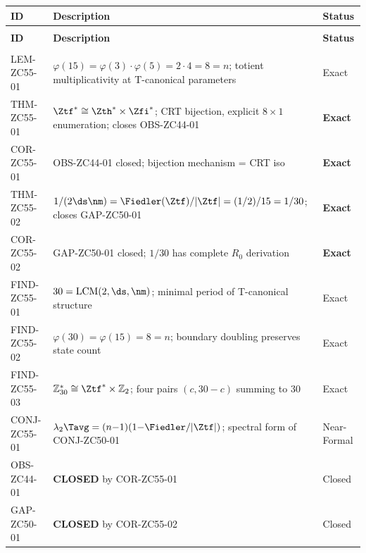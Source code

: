 \documentclass[12pt, a4paper]{article}
\begin{document}
\bigskip
{}
\begin{formalbox}[title={Atomic Registry --- ZC55}]
{\small
\setlength{\LTpre}{4pt}
\setlength{\LTpost}{4pt}
\renewcommand{\arraystretch}{1.30}
\begin{longtable}{>{\raggedright\arraybackslash}p{3.2cm}
                  >{\raggedright\arraybackslash}p{7.0cm}
                  >{\centering\arraybackslash}p{2.0cm}}
\toprule
\textbf{ID} & \textbf{Description} & \textbf{Status} \\
\midrule
\endfirsthead
\multicolumn{3}{l}{\small\textit{(continued)}}\\[4pt]
\toprule
\textbf{ID} & \textbf{Description} & \textbf{Status} \\
\midrule
\endhead
\midrule
\multicolumn{3}{r}{\small\textit{(continues)}}\\
\endfoot
\bottomrule
\endlastfoot
LEM-ZC55-01 &
  $\varphi(15)=\varphi(3)\cdot\varphi(5)=2\cdot4=8=n$;
  totient multiplicativity at T-canonical parameters &
  Exact \\[4pt]
THM-ZC55-01 &
  $\Ztf^*\cong\Zth^*\times\Zfi^*$; CRT bijection,
  explicit $8\times1$ enumeration; closes OBS-ZC44-01 &
  \textbf{Exact} \\[4pt]
COR-ZC55-01 &
  OBS-ZC44-01 closed; bijection mechanism = CRT iso &
  \textbf{Exact} \\[4pt]
THM-ZC55-02 &
  $1/(2\ds\nm)=\Fiedler(\Ztf)/|\Ztf|=(1/2)/15=1/30$;
  closes GAP-ZC50-01 &
  \textbf{Exact} \\[4pt]
COR-ZC55-02 &
  GAP-ZC50-01 closed; $1/30$ has complete $R_0$ derivation &
  \textbf{Exact} \\[4pt]
FIND-ZC55-01 &
  $30=\mathrm{LCM}(2,\ds,\nm)$; minimal period of
  T-canonical structure &
  Exact \\[4pt]
FIND-ZC55-02 &
  $\varphi(30)=\varphi(15)=8=n$; boundary doubling
  preserves state count &
  Exact \\[4pt]
FIND-ZC55-03 &
  $\mathbb{Z}_{30}^*\cong\Ztf^*\times\mathbb{Z}_2$;
  four pairs $(c,30{-}c)$ summing to $30$ &
  Exact \\[4pt]
CONJ-ZC55-01 &
  $\lambda_2\Tavg=(n{-}1)(1{-}\Fiedler/|\Ztf|)$;
  spectral form of CONJ-ZC50-01 &
  Near-Formal \\[4pt]
\midrule
OBS-ZC44-01 & \textbf{CLOSED} by COR-ZC55-01 & Closed \\[4pt]
GAP-ZC50-01 & \textbf{CLOSED} by COR-ZC55-02 & Closed \\
\end{longtable}
}
\end{formalbox}
\end{document}
